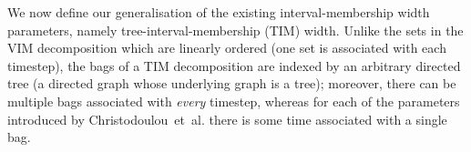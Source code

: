 \documentclass[a4paper,UKenglish,cleveref, autoref, thm-restate]{lipics-v2021} %
\begin{document}
We now define our generalisation of the existing interval-membership width parameters, namely tree-interval-membership (TIM) width.  
Unlike the sets in the VIM decomposition which are linearly ordered (one set is associated with each timestep), the bags of a TIM decomposition are indexed by an arbitrary directed tree (a directed graph whose underlying graph is a tree); moreover, there can be multiple bags associated with \emph{every} timestep, whereas for each of the parameters introduced by Christodoulou~et~al. there is some time associated with a single bag.  
\end{document}
